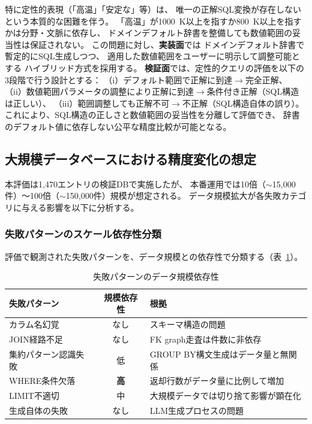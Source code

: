 \documentclass[5p,twocolumn]{elsarticle}
\begin{document}
特に定性的表現（「高温」「安定な」等）は、
唯一の正解SQL変換が存在しないという本質的な困難を伴う。
「高温」が1000~K以上を指すか800~K以上を指すかは分野・文脈に依存し、
ドメインデフォルト辞書を整備しても数値範囲の妥当性は保証されない。
この問題に対し、\textbf{実装面}では
ドメインデフォルト辞書で暫定的にSQL生成しつつ、
適用した数値範囲をユーザーに明示して調整可能とする
ハイブリッド方式を採用する。
\textbf{検証面}では、定性的クエリの評価を以下の3段階で行う設計とする：
（i）デフォルト範囲で正解に到達$\to$完全正解、
（ii）数値範囲パラメータの調整により正解に到達$\to$条件付き正解（SQL構造は正しい）、
（iii）範囲調整しても正解不可$\to$不正解（SQL構造自体の誤り）。
これにより、SQL構造の正しさと数値範囲の妥当性を分離して評価でき、
辞書のデフォルト値に依存しない公平な精度比較が可能となる。

\subsection{大規模データベースにおける精度変化の想定}
\label{sec:scale_prediction}

本評価は1{,}470エントリの検証DBで実施したが、
本番運用では10倍（${\sim}$15{,}000件）〜100倍（${\sim}$150{,}000件）規模が想定される。
データ規模拡大が各失敗カテゴリに与える影響を以下に分析する。

\subsubsection{失敗パターンのスケール依存性分類}

評価で観測された失敗パターンを、データ規模との依存性で分類する（表~\ref{tab:scale_dependency}）。

\begin{table}[tbp]
\centering
\caption{失敗パターンのデータ規模依存性}
\label{tab:scale_dependency}
\footnotesize
\begin{tabular}{p{2.0cm}cp{2.8cm}}
\hline
失敗パターン & 規模依存性 & 根拠 \\
\hline
カラム名幻覚 & なし & スキーマ構造の問題 \\
JOIN経路不足 & なし & FK graph走査は件数に非依存 \\
集約パターン認識失敗 & 低 & GROUP BY構文生成はデータ量と無関係 \\
WHERE条件欠落 & \textbf{高} & 返却行数がデータ量に比例して増加 \\
LIMIT不適切 & 中 & 大規模データでは切り捨て影響が顕在化 \\
生成自体の失敗 & なし & LLM生成プロセスの問題 \\
\hline
\end{tabular}
\end{table}
\end{document}

